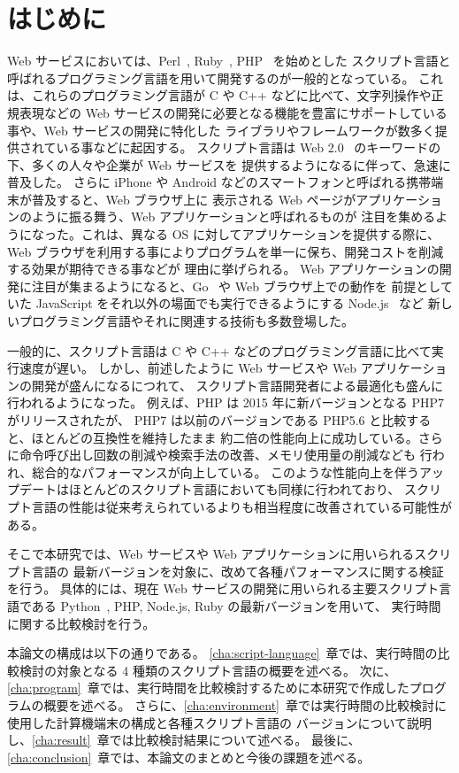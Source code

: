 \chapter{はじめに}
\label{cha:intro}

Web サービスにおいては、Perl~\cite{Perl}, Ruby~\cite{Ruby}, PHP~\cite{PHP} を始めとした
スクリプト言語と呼ばれるプログラミング言語を用いて開発するのが一般的となっている。
これは、これらのプログラミング言語が C や C++ などに比べて、文字列操作や正規表現などの
Web サービスの開発に必要となる機能を豊富にサポートしている事や、Web サービスの開発に特化した
ライブラリやフレームワークが数多く提供されている事などに起因する。
スクリプト言語は Web 2.0~\cite{Web20} のキーワードの下、多くの人々や企業が Web サービスを
提供するようになるに伴って、急速に普及した。
さらに iPhone や Android などのスマートフォンと呼ばれる携帯端末が普及すると、Web ブラウザ上に
表示される Web ページがアプリケーションのように振る舞う、Web アプリケーションと呼ばれるものが
注目を集めるようになった。これは、異なる OS に対してアプリケーションを提供する際に、
Web ブラウザを利用する事によりプログラムを単一に保ち、開発コストを削減する効果が期待できる事などが
理由に挙げられる。
Web アプリケーションの開発に注目が集まるようになると、Go~\cite{Go} や Web ブラウザ上での動作を
前提としていた JavaScript をそれ以外の場面でも実行できるようにする Node.js~\cite{NodeJS} など
新しいプログラミング言語やそれに関連する技術も多数登場した。 

一般的に、スクリプト言語は C や C++ などのプログラミング言語に比べて実行速度が遅い。
しかし、前述したように Web サービスや Web アプリケーションの開発が盛んになるにつれて、
スクリプト言語開発者による最適化も盛んに行われるようになった。
例えば、PHP は 2015 年に新バージョンとなる PHP7~\cite{PHP7} がリリースされたが、
PHP7 は以前のバージョンである PHP5.6 と比較すると、ほとんどの互換性を維持したまま
約二倍の性能向上に成功している。さらに命令呼び出し回数の削減や検索手法の改善、メモリ使用量の削減なども
行われ、総合的なパフォーマンスが向上している。
このような性能向上を伴うアップデートはほとんどのスクリプト言語においても同様に行われており、
スクリプト言語の性能は従来考えられているよりも相当程度に改善されている可能性がある。

そこで本研究では、Web サービスや Web アプリケーションに用いられるスクリプト言語の
最新バージョンを対象に、改めて各種パフォーマンスに関する検証を行う。
具体的には、現在 Web サービスの開発に用いられる主要スクリプト言語である
Python~\cite{Python}, PHP, Node.js, Ruby の最新バージョンを用いて、
実行時間に関する比較検討を行う。

本論文の構成は以下の通りである。
\ref{cha:script-language}~章では、実行時間の比較検討の対象となる 4 種類のスクリプト言語の概要を述べる。
次に、\ref{cha:program}~章では、実行時間を比較検討するために本研究で作成したプログラムの概要を述べる。
さらに、\ref{cha:environment}~章では実行時間の比較検討に使用した計算機端末の構成と各種スクリプト言語の
バージョンについて説明し、\ref{cha:result}~章では比較検討結果について述べる。
最後に、\ref{cha:conclusion}~章では、本論文のまとめと今後の課題を述べる。